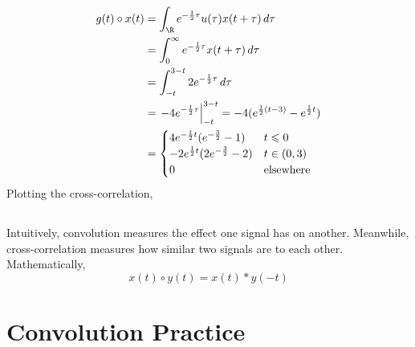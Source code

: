 \documentclass{article}
\begin{document}
\begin{align}
    g(t) \circ x(t) &= \int_{\R} e^{-\frac{1}{2} \tau} u(\tau) x(t + \tau) \, d\tau \\
    &= \int_0^\infty e^{-\frac{1}{2} \tau} x(t + \tau) \, d\tau \\
    &= \int_{-t}^{3 - t} 2e^{-\frac{1}{2} \tau} \, d\tau \\
    &= \left.-4e^{-\frac{1}{2} \tau}\right|_{-t}^{3 - t} = -4(e^{\frac{1}{2} (t - 3)} - e^{\frac{1}{2} t}) \\
    &=
    \begin{cases}
        4e^{-\frac{t}{2} t} (e^{-\frac{3}{2}} - 1) & t \leqslant 0 \\
        -2e^{\frac{1}{2} t} (2e^{-\frac{3}{2}} - 2) & t \in (0, 3) \\
        0 & \text{elsewhere}
    \end{cases}
\end{align}
Plotting the cross-correlation,
\begin{center}
\end{center}

\subsection{}

Intuitively, convolution measures the effect one signal has on another.
Meanwhile, cross-correlation measures how similar two signals are to each other.
Mathematically,
\begin{equation}
    x(t) \circ y(t) = x(t) \ast y(-t)
\end{equation}

\section{Convolution Practice}

\subsection{}
\end{document}
